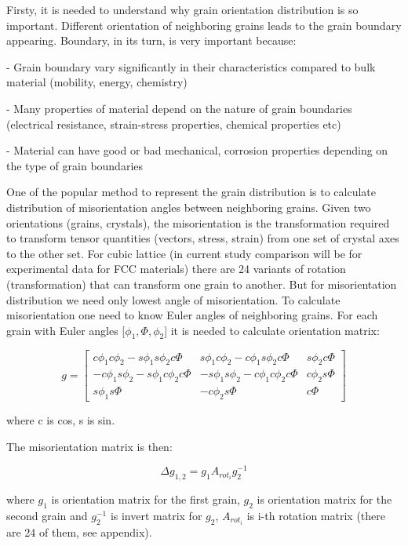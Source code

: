\documentclass[12pt]{report}
\begin{document}
Firsty, it is needed to understand why grain orientation distribution is so important. Different orientation of neighboring grains leads to the grain boundary appearing. Boundary, in its turn, is very important because:

- Grain boundary vary significantly in their characteristics compared to bulk material (mobility, energy, chemistry)

- Many properties of material depend on the nature of grain boundaries (electrical resistance, strain-stress properties, chemical properties etc)

- Material can have good or bad mechanical, corrosion properties depending on the type of grain boundaries
  
One of the popular method to represent the grain distribution is to calculate distribution of misorientation angles between neighboring grains. Given two orientations (grains, crystals), the misorientation is the transformation required to transform tensor quantities (vectors, stress, strain) from one set of crystal axes to the other set. For cubic lattice (in current study comparison will be for experimental data for FCC materials) there are 24 variants of rotation (transformation) that can transform one grain to another. But for misorientation distribution we need only lowest angle of misorientation. To calculate misorientation one need to know Euler angles of neighboring grains. For each grain with Euler angles [$\phi_1, \Phi, \phi_2$] it is needed to calculate orientation matrix:

\begin{equation} \label{orientmatrix}
g = \begin{bmatrix}
    c\phi_1c\phi_2 - s\phi_1s\phi_2c\Phi & s\phi_1c\phi_2 - c\phi_1s\phi_2c\Phi & s\phi_2c\Phi \\
    -c\phi_1s\phi_2 - s\phi_1c\phi_2c\Phi & -s\phi_1s\phi_2 - c\phi_1c\phi_2c\Phi & c\phi_2s\Phi \\
    s\phi_1s\Phi & -c\phi_2s\Phi & c\Phi
\end{bmatrix}
\end{equation}
\bigbreak

where c is cos, s is sin.

The misorientation matrix is then:

\begin{equation} \label{mismatrix}
\Delta g_{1,2} = g_1A_{rot_i}g^{-1}_2
\end{equation}
\bigbreak

where $g_1$ is orientation matrix for the first grain, $g_2$ is orientation matrix for the second grain and $g^{-1}_2$ is invert matrix for $g_2$, $A_{rot_i}$ is i-th rotation matrix (there are 24 of them, see appendix).
\end{document}
